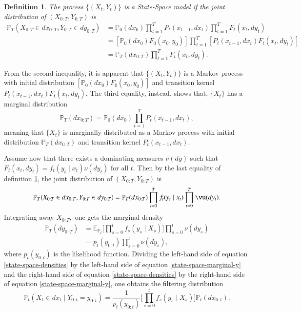 \documentclass[
]{book}
\theoremstyle{break}
\newtheorem{definition}{Definition}
\theoremstyle{nonumberplain}
\newtheorem{definition}{Definition}
\begin{document}
\begin{definition}\label{state-space-def}
The process $\{(X_t,Y_t)\}$ is a State-Space model if the joint distribution of $(X_{0:T},Y_{0:T})$ is 
\begin{align*}
  \mathbb{P}_T(X_{0:T}\in dx_{0:T},Y_{0:T}\in dy_{0:T}) &= \mathbb{P}_0(dx_0)\prod\limits_{t=1}^T P_t(x_{t-1},dx_t)\prod\limits_{t=1}^T F_t(x_t,dy_t)\\
  &= [\mathbb{P}_0(dx_0)F_0(x_0,y_0)]\prod\limits_{t=1}^T[P_t(x_{t-1},dx_t)F_t(x_t,dy_t)] \\
  &= \mathbb{P}_T(dx_{0:T})\prod \limits_{t=1}^T F_t(x_t,dy_t).
\end{align*}
\end{definition}

From the second inequality, it is apparent that \(\{(X_t,Y_t)\}\) is a
Markov process with initial distribution
\([\mathbb{P}_0(dx_0)F_0(x_0,y_0)]\) and transition kernel
\(P_t(x_{t-1},dx_t)F_t(x_t,dy_t).\) The third equality, instead, shows
that, \(\{X_t\}\) has a marginal distribution
\[\mathbb{P}_T(dx_{0:T})=\mathbb{P}_0(dx_0)\prod_{t=1}^T P_t(x_{t-1},dx_t),\]
meaning that \(\{X_t\}\) is marginally distributed as a Markov process
with initial distribution \(\mathbb{P}_T(dx_{0:T})\) and transition
kernel \(P_t(x_{t-1},dx_t).\)

Assume now that there exists a dominating measures \(\nu(dy)\) such that
\(F_t(x_t,dy_t)=f_t(y_t\mid x_t)\nu(dy_t)\) for all \(t.\) Then by the
last equality of definition \ref{state-space-def}, the joint
distribution of \((X_{0:T},Y_{0:T})\) is
\begin{equation}\label{state-space-densities}
   \mathbb{P}_T(X_{0:T}\in dx_{0:T},Y_{0:T}\in dy_{0:T})=\mathbb{P}_T(dx_{0:T})\prod\limits_{t=0}^T f_t(y_t\mid x_t)\prod\limits_{t=0}^T\vu(dy_t).
\end{equation} Integrating away \(X_{0:T},\) one gets the marginal
density \begin{equation}\label{state-space-marginal-y}
\begin{align*}
  \mathbb{P}_T(dy_{0:T}) &= \mathbb E_{\mathbb{P}_{t}}\big[\prod\limits_{s=0}^t f_s(y_s\mid X_s) \big] \prod\limits_{s=0}^t\nu(dy_s) \\
                &= p_t(y_{0:t})\prod\limits_{s=0}^t\nu(dy_s),
\end{align*}                
\end{equation} where \(p_t(y_{0:t})\) is the likelihood function.
Dividing the left-hand side of equation \ref{state-space-densities} by
the left-hand side of equation \ref{state-space-marginal-y} and the
right-hand side of equation \ref{state-space-densities} by the
right-hand side of equation \ref{state-space-marginal-y}, one obtains
the filtering distribution \begin{equation}
\mathbb{P}_t(X_{t}\in dx_{t}\mid Y_{0:t}=y_{0:t})=\frac{1}{p_t(y_{0:t})}\big[\prod\limits_{s=0}^t f_s(y_s\mid X_s) \big]\mathbb{P}_t(dx_{0:t}).
\end{equation}
\end{document}
